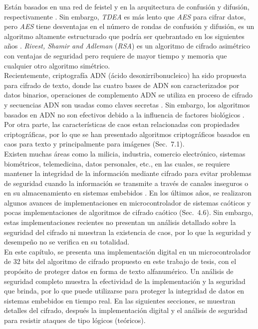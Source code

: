 Están basados en una red de feistel y en la arquitectura de confusión y difusión, respectivamente \cite{FIPS46_1999, FIPS197_2001}. Sin embargo, \textit{TDEA} es más lento que \textit{AES} para cifrar datos, pero \textit{AES} tiene desventajas en el número de rondas de confusión y difusión, es un algoritmo altamente estructurado que podría ser quebrantado en los siguientes años \cite{FEtAl_2001}. \textit{Rivest, Shamir and Adleman} (\textit{RSA}) es un algoritmo de cifrado asimétrico con ventajas de seguridad pero requiere de mayor tiempo y memoria que cualquier otro algoritmo simétrico. \\

Recientemente, criptografía ADN (ácido desoxirribonucleico) ha sido propuesta para cifrado de texto, donde las cuatro bases de ADN son caracterizados por datos binarios, operaciones de complemento ADN se utiliza en proceso de cifrado y secuencias ADN son usadas como claves secretas \cite{A_1994, GEtAl_2006a, ByT_2010, XEtAl_2010, AEtAl_2011, LEtAl_2013a}. Sin embargo, los algoritmos basados en ADN no son efectivos debido a la influencia de factores biológicos \cite{ZEtAl_2012}. Por otra parte, las características de caos estan relacionadas con propiedades criptográficas, por lo que se han presentado algoritmos criptográficos basados en caos para texto \cite{MyM_2012} y principalmente para imágenes (Sec.~7.1). \\       

Existen muchas áreas como la milicia, industria, comercio electrónico, sistemas biométricos, telemedicina, datos personales, etc., en las cuales, se requiere mantener la integridad de la información mediante cifrado para evitar problemas de seguridad cuando la información se transmite a través de canales inseguros o en su almacenamiento en sistemas embebidos \cite{FyS_2014}. En los últimos años, se realizaron algunos avances de implementaciones en microcontrolador de sistemas caóticos y pocas implementaciones de algoritmos de cifrado caótico (Sec.~4.6). Sin embargo, estas implementaciones recientes no presentan un análisis detallado sobre la seguridad del cifrado ni muestran la existencia de caos, por lo que la seguridad y desempeño no se verifica en su totalidad. \\

En este capítulo, se presenta una implementación digital en un microcontrolador de 32 bits del algoritmo de cifrado propuesto en este trabajo de tesis, con el propósito de proteger datos en forma de texto alfanumérico. Un análisis de seguridad  completo muestra la efectividad de la implementación y la seguridad que brinda, por lo que puede utilizarse para proteger la integridad de datos en sistemas embebidos en tiempo real. En las siguientes secciones, se muestran detalles del cifrado, después la implementación digital y el análisis de seguridad para resistir ataques de tipo lógicos (teóricos).


